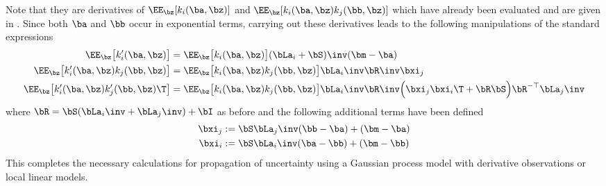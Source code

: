 Note that they are derivatives of $\EE_{\bz}[k_i(\ba,\bz)]$ and $\EE_{\bz}[k_i(\ba,\bz)k_j(\bb,\bz)]$ which have already been evaluated and are given in . Since both $\ba$ and $\bb$ occur in exponential terms, carrying out these derivatives leads to the following manipulations of the standard expressions
\begin{align}
\EE_{\bz}\big[k_i'(\ba,\bz)\big] &= \EE_{\bz}\big[k_i(\ba,\bz)\big] (\bLa_i+\bS)\inv(\bm - \ba) \\
%
\EE_{\bz}\big[k'_i(\ba,\bz)k_j(\bb,\bz)\big]
&= \EE_{\bz}\big[k_i(\ba,\bz)k_j(\bb,\bz)\big] \bLa_i\inv \bR\inv \bxi_j \\
%
\EE_{\bz}\big[k'_i(\ba,\bz)k_j'(\bb,\bz)\T\big]
&= \EE_{\bz}\big[k_i(\ba,\bz)k_j(\bb,\bz)\big] \bLa_i\inv \bR\inv \Big(\bxi_j\bxi_i\T + \bR\bS\Big) \bR^{-\top}\bLa_j\inv
\end{align}
where $\bR = \bS(\bLa_i\inv + \bLa_j\inv) + \bI$ as before and the following additional terms have been defined
\begin{align*}
\bxi_j &:= \bS\bLa_j\inv(\bb - \ba) + (\bm - \ba) \\
\bxi_i &:= \bS\bLa_i\inv(\ba - \bb) + (\bm - \bb)
\end{align*}
This completes the necessary calculations for propagation of uncertainty using a Gaussian process model with derivative observations or local linear models.






